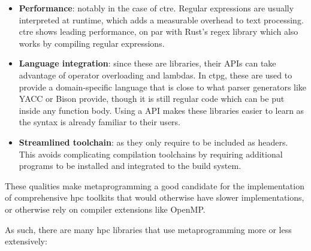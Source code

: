 \documentclass[../main]{subfiles}
\begin{document}
\begin{itemize}

  \item

\textbf{Performance}: notably in the case of \gls{ctre}.
Regular expressions are usually interpreted at runtime,
which adds a measurable overhead to text processing.
\gls{ctre} shows leading performance, on par with Rust's regex library
which also works by compiling regular expressions.

  \item

\textbf{Language integration}: since these are \cpp libraries,
their APIs can take advantage of \cpp operator overloading and lambdas.
In \gls{ctpg}, these are used to provide a domain-specific language that is close to
what parser generators like YACC or Bison provide,
though it is still regular \cpp code which can be put inside any function body.
Using a \cpp API makes these libraries easier to learn
as the syntax is already familiar to their users.

  \item

\textbf{Streamlined toolchain}: as they only require to be included as headers.
This avoids complicating compilation toolchains by requiring additional programs
to be installed and integrated to the build system.

\end{itemize}

These qualities make metaprogramming a good candidate for the implementation
of comprehensive \gls{hpc} toolkits that would otherwise have
slower implementations, or otherwise rely on compiler extensions like OpenMP.

As such, there are many \cpp \gls{hpc} libraries that use metaprogramming
more or less extensively:
\end{document}
